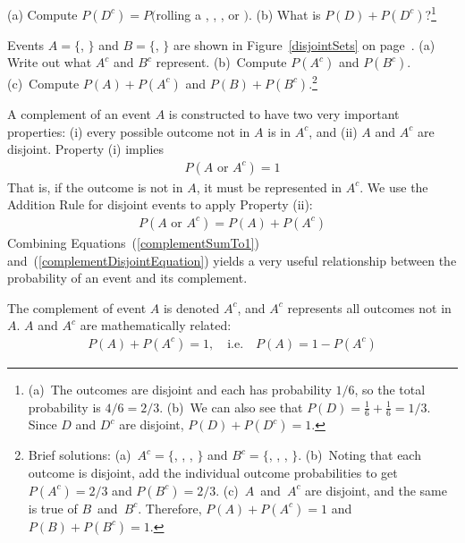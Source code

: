 \begin{exercise}
(a) Compute $P(D^c) = P($rolling a , , , or $)$. (b) What is $P(D) + P(D^c)$?\footnote{(a)~The outcomes are disjoint and each has probability $1/6$, so the total probability is $4/6=2/3$. (b)~We can also see that $P(D)=\frac{1}{6} + \frac{1}{6} = 1/3$. Since $D$ and $D^c$ are disjoint, $P(D) + P(D^c) = 1$.}
\end{exercise}

\begin{exercise}
Events $A=\{$, $\}$ and $B=\{$, $\}$ are shown in Figure~\ref{disjointSets} on page~\pageref{disjointSets}. (a) Write out what $A^c$ and $B^c$ represent. (b)~Compute $P(A^c)$ and $P(B^c)$. (c)~Compute $P(A)+P(A^c)$ and $P(B)+P(B^c)$.\footnote{Brief solutions: (a)~$A^c=\{$, , , $\}$ and $B^c=\{$, , , $\}$. (b)~Noting that each outcome is disjoint, add the individual outcome probabilities to get $P(A^c)=2/3$ and $P(B^c)=2/3$. (c)~$A$~and~$A^c$ are disjoint, and the same is true of $B$~and~$B^c$. Therefore, $P(A) + P(A^c) = 1$ and $P(B) + P(B^c) = 1$.}
\end{exercise}

A complement of an event $A$ is constructed to have two very important properties: (i) every possible outcome not in $A$ is in $A^c$, and (ii) $A$ and $A^c$ are disjoint. Property (i) implies
\begin{eqnarray}
P(A\text{ or }A^c) = 1
\label{complementSumTo1}
\end{eqnarray}
That is, if the outcome is not in $A$, it must be represented in $A^c$. We use the Addition Rule for disjoint events to apply Property (ii):
\begin{eqnarray}
P(A\text{ or }A^c) = P(A) + P(A^c)
\label{complementDisjointEquation}
\end{eqnarray}
Combining Equations~(\ref{complementSumTo1}) and~(\ref{complementDisjointEquation}) yields a very useful relationship between the probability of an event and its complement.

\begin{termBox}{
The complement of event $A$ is denoted $A^c$, and $A^c$ represents all outcomes not in~$A$. $A$ and $A^c$ are mathematically related: \vspace{-2mm}
\begin{eqnarray}\label{complement}
P(A) + P(A^c) = 1, \quad\text{i.e.}\quad P(A) = 1-P(A^c)
\end{eqnarray}\vspace{-6.5mm}}
\end{termBox}

